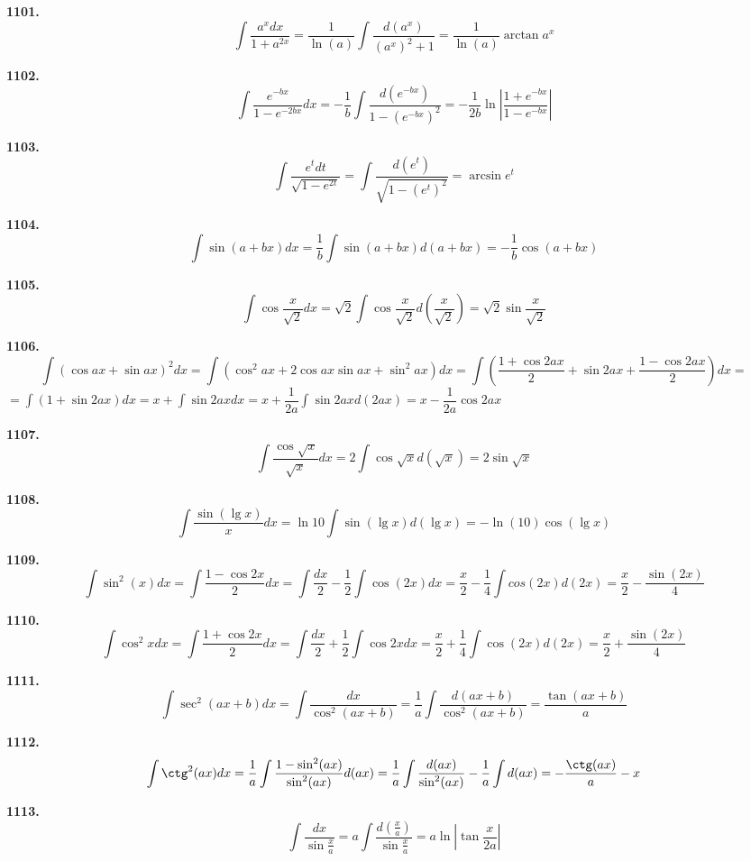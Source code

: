 \documentclass[12pt]{article}
\begin{document}
	{\bf 1101.} \[
		\int \dfrac{a^x dx}{1+a^{2x}} = \dfrac{1}{\ln(a)}\int \dfrac{d(a^x)}{(a^x)^2+1} = \dfrac{1}{\ln(a)}\arctan a^x
	\]
	
	{\bf 1102.} \[
		\int \dfrac{e^{-bx}}{1-e^{-2bx}}dx = -\dfrac{1}{b}\int \dfrac{d(e^{-bx})}{1-(e^{-bx})^2} = -\dfrac{1}{2b}\ln\left|\dfrac{1+e^{-bx}}{1-e^{-bx}}\right|
	\]
	
	{\bf 1103.} \[
		\int \dfrac{e^t dt}{\sqrt{1-e^{2t}}} = \int \dfrac{d(e^t)}{\sqrt{1-(e^t)^2}} = \arcsin e^t
	\]
	
	{\bf 1104.} \[
		\int \sin(a+bx)dx = \dfrac{1}{b}\int \sin(a+bx)d(a+bx) = -\dfrac{1}{b}\cos (a+bx)
	\]
	
	{\bf 1105.} \[
		\int \cos\dfrac{x}{\sqrt{2}}dx = \sqrt{2}\int \cos \dfrac{x}{\sqrt{2}}d(\dfrac{x}{\sqrt{2}}) = \sqrt{2}\sin\dfrac{x}{\sqrt{2}}
	\]
	
	{\bf 1106.} \[
		\int (\cos ax + \sin ax)^2 dx = \int (\cos^2 ax +2\cos ax\sin ax+\sin^2 ax)dx = \int \left(\dfrac{1+\cos 2ax}{2} + \sin 2ax + \dfrac{1-\cos 2ax}{2}\right)dx = 
	\]
	$
	 = \displaystyle\int (1+\sin 2ax)dx = x +\int \sin 2ax dx = x+\dfrac{1}{2a}\int \sin 2ax d(2ax) = x -\dfrac{1}{2a} \cos 2ax
	$
	
	\bigskip
	{\bf 1107.} \[
		\int \dfrac{\cos \sqrt{x}}{\sqrt{x}}dx = 2\int \cos\sqrt{x} d(\sqrt{x}) = 2\sin \sqrt{x}
	\]
	
	{\bf 1108.} \[
		\int \dfrac{\sin(\lg x)}{x}dx =\ln 10 \int \sin (\lg x)d(\lg x) = -\ln (10) \cos (\lg x)
	\]
	
	{\bf 1109.} \[
		\int \sin^2 (x) dx = \int \dfrac{1-\cos 2x}{2} dx  = \int \dfrac{dx}{2} - \dfrac{1}{2}\int \cos(2x)dx = \dfrac{x}{2} -  \dfrac{1}{4}\int cos(2x)d(2x) = \dfrac{x}{2} - \dfrac{\sin(2x)}{4}
	\]
	
	{\bf 1110.} \[
		\int \cos^2 x dx = \int \dfrac{1+\cos 2x}{2}dx = \int \dfrac{dx}{2} + \dfrac{1}{2}\int \cos 2x dx = \dfrac{x}{2} + \dfrac{1}{4}\int \cos(2x)d(2x) = \dfrac{x}{2} + \dfrac{\sin(2x)}{4}
	\]
	
	{\bf 1111.} \[
		\int \sec^2(ax+b) dx = \int \dfrac{dx}{\cos^2(ax+b)} = \dfrac{1}{a} \int \dfrac{d(ax+b)}{\cos^2(ax+b)} = \dfrac{\tan(ax+b)}{a}
	\]
	
	{\bf 1112.} \[
		\int \ctg^2(ax) dx = \dfrac{1}{a}\int \dfrac{1-\sin^2(ax)}{\sin^2(ax)}d(ax) = \dfrac{1}{a}\int \dfrac{d(ax)}{\sin^2(ax)} - \dfrac{1}{a}\int d(ax) = -\dfrac{\ctg(ax)}{a} - x 
	\]
	
	{\bf 1113.} \[
		\int \dfrac{dx}{\sin\frac{x}{a}} = a\int \dfrac{d(\frac{x}{a})}{\sin\frac{x}{a}} = a\ln|\tan\dfrac{x}{2a}|
	\]
	
\end{document}
